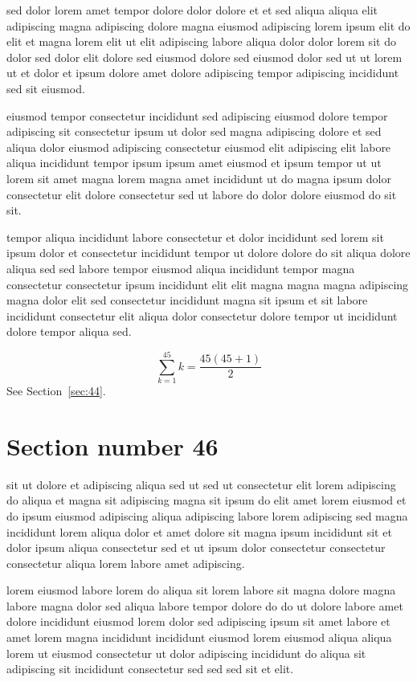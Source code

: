\documentclass{article}
\begin{document}
sed dolor lorem amet tempor dolore dolor dolore et et sed aliqua aliqua elit adipiscing magna adipiscing dolore magna eiusmod adipiscing lorem ipsum elit do elit et magna lorem elit ut elit adipiscing labore aliqua dolor dolor lorem sit do dolor sed dolor elit dolore sed eiusmod dolore sed eiusmod dolor sed ut ut lorem ut et dolor et ipsum dolore amet dolore adipiscing tempor adipiscing incididunt sed sit eiusmod.

eiusmod tempor consectetur incididunt sed adipiscing eiusmod dolore tempor adipiscing sit consectetur ipsum ut dolor sed magna adipiscing dolore et sed aliqua dolor eiusmod adipiscing consectetur eiusmod elit adipiscing elit labore aliqua incididunt tempor ipsum ipsum amet eiusmod et ipsum tempor ut ut lorem sit amet magna lorem magna amet incididunt ut do magna ipsum dolor consectetur elit dolore consectetur sed ut labore do dolor dolore eiusmod do sit sit.

tempor aliqua incididunt labore consectetur et dolor incididunt sed lorem sit ipsum dolor et consectetur incididunt tempor ut dolore dolore do sit aliqua dolore aliqua sed sed labore tempor eiusmod aliqua incididunt tempor magna consectetur consectetur ipsum incididunt elit elit magna magna magna adipiscing magna dolor elit sed consectetur incididunt magna sit ipsum et sit labore incididunt consectetur elit aliqua dolor consectetur dolore tempor ut incididunt dolore tempor aliqua sed.

\begin{equation} \sum_{k=1}^{45} k = \frac{45(45+1)}{2} \end{equation}
See Section~\ref{sec:44}.

\section{Section number 46}\label{sec:46}
sit ut dolore et adipiscing aliqua sed ut sed ut consectetur elit lorem adipiscing do aliqua et magna sit adipiscing magna sit ipsum do elit amet lorem eiusmod et do ipsum eiusmod adipiscing aliqua adipiscing labore lorem adipiscing sed magna incididunt lorem aliqua dolor et amet dolore sit magna ipsum incididunt sit et dolor ipsum aliqua consectetur sed et ut ipsum dolor consectetur consectetur consectetur aliqua lorem labore amet adipiscing.

lorem eiusmod labore lorem do aliqua sit lorem labore sit magna dolore magna labore magna dolor sed aliqua labore tempor dolore do do ut dolore labore amet dolore incididunt eiusmod lorem dolor sed adipiscing ipsum sit amet labore et amet lorem magna incididunt incididunt eiusmod lorem eiusmod aliqua aliqua lorem ut eiusmod consectetur ut dolor adipiscing incididunt do aliqua sit adipiscing sit incididunt consectetur sed sed sed sit et elit.
\end{document}
